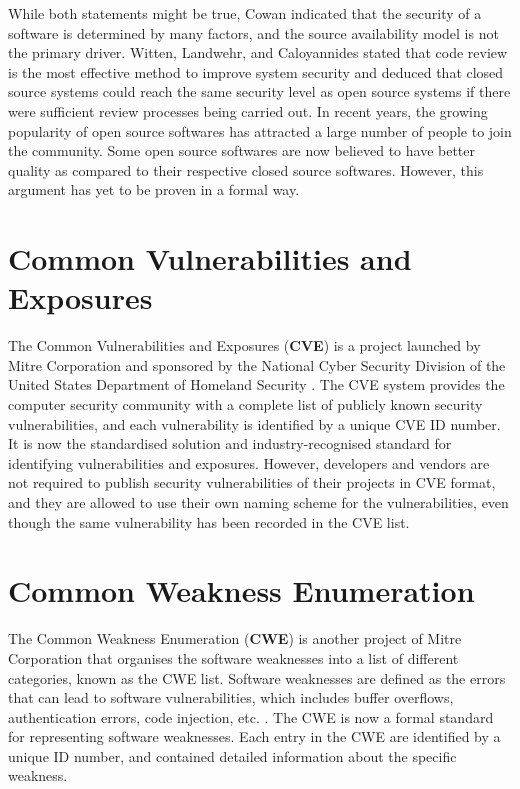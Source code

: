 \documentclass[12pt, a4paper]{report}
\begin{document}
While both statements might be true, Cowan \cite{cowan_2003} indicated that the security of a
software is determined by many factors, and the source availability model is not the primary driver.
Witten, Landwehr, and Caloyannides \cite{witten_2001} stated that code review is the most effective
method to improve system security and deduced that closed source systems could reach the same
security level as open source systems if there were sufficient review processes being carried out.
In recent years, the growing popularity of open source softwares has attracted a large number of
people to join the community. Some open source softwares are now believed to have better quality as
compared to their respective closed source softwares. However, this argument has yet to be proven in
a formal way.

\section{Common Vulnerabilities and Exposures}
The Common Vulnerabilities and Exposures (\textbf{CVE}) is a project launched by Mitre Corporation
and sponsored by the National Cyber Security Division of the United States Department of Homeland
Security \cite{cve}. The CVE system provides the computer security community with a complete list of
publicly known security vulnerabilities, and each vulnerability is identified by a unique CVE ID
number. It is now the standardised solution and industry-recognised standard for identifying
vulnerabilities and exposures. However, developers and vendors are not required to publish security
vulnerabilities of their projects in CVE format, and they are allowed to use their own naming scheme
for the vulnerabilities, even though the same vulnerability has been recorded in the CVE list.

\section{Common Weakness Enumeration}
The Common Weakness Enumeration (\textbf{CWE}) is another project of Mitre Corporation \cite{cwe}
that organises the software weaknesses into a list of different categories, known as the CWE list.
Software weaknesses are defined as the errors that can lead to software vulnerabilities, which
includes buffer overflows, authentication errors, code injection, etc. \cite{cwe_faq}. The CWE is
now a formal standard for representing software weaknesses. Each entry in the CWE are identified by
a unique ID number, and contained detailed information about the specific weakness.
\end{document}
